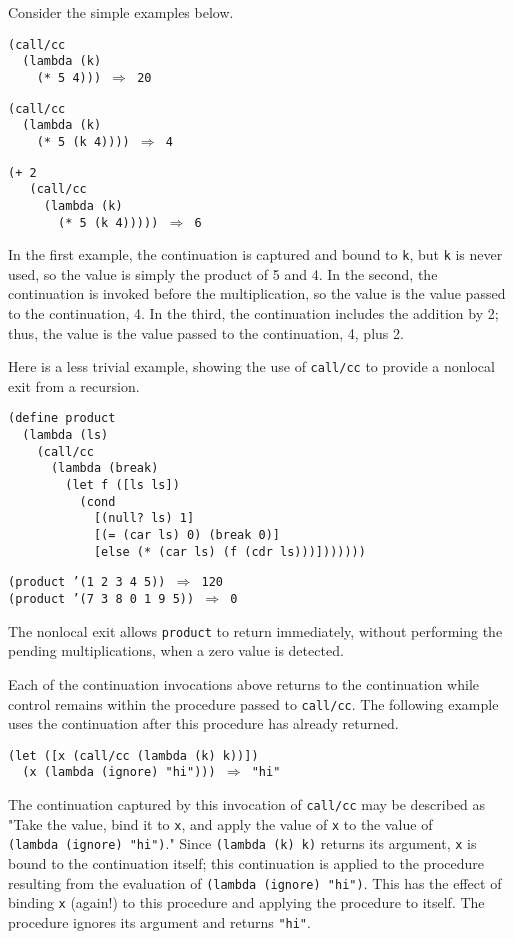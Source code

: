 Consider the simple examples below.


\begin{alltt}
(call/cc
  (lambda (k)
    (* 5 4))) \(\Rightarrow\) 20

(call/cc
  (lambda (k)
    (* 5 (k 4)))) \(\Rightarrow\) 4

(+ 2
   (call/cc
     (lambda (k)
       (* 5 (k 4))))) \(\Rightarrow\) 6
\end{alltt}


In the first example, the continuation is captured and bound to \texttt{k},
but \texttt{k} is never used, so the value is simply the product
of 5 and 4.
In the second, the continuation is invoked before the multiplication, so
the value is the value passed to the continuation, 4.
In the third, the continuation includes the addition by 2; thus, the
value is the value passed to the continuation, 4, plus 2.


\label{further_s63}Here is a less trivial example, showing the use of
\texttt{call/cc} to provide a nonlocal exit from a recursion.


\begin{alltt}
(define product\label{further_defn_product_call_cc}
  (lambda (ls)
    (call/cc
      (lambda (break)
        (let f ([ls ls])
          (cond
            [(null? ls) 1]
            [(= (car ls) 0) (break 0)]
            [else (* (car ls) (f (cdr ls)))]))))))
\end{alltt}


\begin{alltt}
(product '(1 2 3 4 5)) \(\Rightarrow\) 120
(product '(7 3 8 0 1 9 5)) \(\Rightarrow\) 0
\end{alltt}


The nonlocal exit allows \texttt{product} to return immediately,
without performing the pending multiplications,
when a zero value is detected.


Each of the continuation invocations above returns to the continuation
while control remains within the procedure passed to \texttt{call/cc}.
The following example uses the continuation after this procedure
has already returned.


\begin{alltt}
(let ([x (call/cc (lambda (k) k))])
  (x (lambda (ignore) "hi"))) \(\Rightarrow\) "hi"
\end{alltt}


The continuation captured by this invocation of \texttt{call/cc} may be described as
"Take the value, bind it to \texttt{x}, and apply the value of \texttt{x} to
the value of \texttt{(lambda (ignore) "hi")}."
Since \texttt{(lambda (k) k)} returns its argument, \texttt{x} is bound to the
continuation itself; this continuation is applied to the procedure resulting
from the evaluation of \texttt{(lambda (ignore) "hi")}.
This has the effect of binding \texttt{x} (again!) to this procedure and
applying the procedure to itself.
The procedure ignores its argument and returns \texttt{"hi"}.


